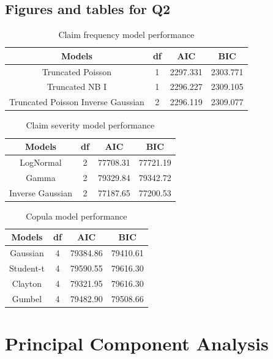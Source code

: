 \documentclass[
]{article}
\theoremstyle{plain}
\theoremstyle{definition}
\theoremstyle{remark}
\begin{document}
\newpage

\subsection{Figures and tables for Q2}\label{figures-and-tables-for-q2}

\begin{table}[!h]
\centering
\caption{\label{tab:Q2freqPerfTable}Claim frequency model performance}
\centering
\begin{tabular}[t]{cccc}
\toprule
Models & df & AIC & BIC\\
\midrule
Truncated Poisson & 1 & 2297.331 & 2303.771\\
Truncated NB I & 1 & 2296.227 & 2309.105\\
Truncated Poisson Inverse Gaussian & 2 & 2296.119 & 2309.077\\
\bottomrule
\end{tabular}
\end{table}

\begin{table}[!h]
\centering
\caption{\label{tab:Q2sevPerfTable}Claim severity model performance}
\centering
\begin{tabular}[t]{cccc}
\toprule
Models & df & AIC & BIC\\
\midrule
LogNormal & 2 & 77708.31 & 77721.19\\
Gamma & 2 & 79329.84 & 79342.72\\
Inverse Gaussian & 2 & 77187.65 & 77200.53\\
\bottomrule
\end{tabular}
\end{table}

\begin{table}[!h]
\centering
\caption{\label{tab:copulaPerfTable}Copula model performance}
\centering
\begin{tabular}[t]{cccc}
\toprule
Models & df & AIC & BIC\\
\midrule
Gaussian & 4 & 79384.86 & 79410.61\\
Student-t & 4 & 79590.55 & 79616.30\\
Clayton & 4 & 79321.95 & 79616.30\\
Gumbel & 4 & 79482.90 & 79508.66\\
\bottomrule
\end{tabular}
\end{table}

\newpage

\section{Principal Component Analysis}\label{principal-component-analysis}
\end{document}
